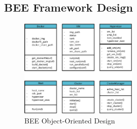 \subsection{BEE Framework Design}
\begin{figure}[h]
    \centering
    \caption{BEE Object-Oriented Design}
    \label{ood}
    \includegraphics[width=0.5\textwidth]{figures/ood.pdf}
\end{figure}
